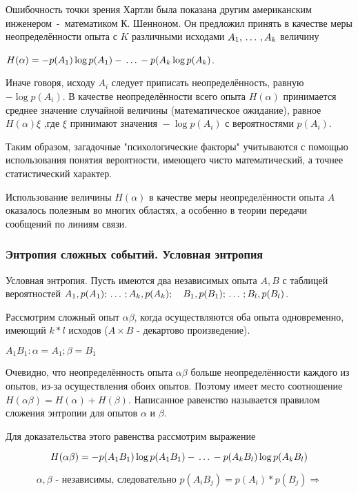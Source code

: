 \documentclass[a4paper,12pt]{report}
\begin{document}
	Ошибочность точки зрения Хартли была показана другим американским инженером~-~математиком К. Шенноном. Он предложил принять в качестве меры неопределённости опыта с $K$ различными исходами $A_1,\,\ldots\,,A_k$ величину
	
	 $H(\alpha) = - p(A_1) \log p(A_1) - \,\ldots\, - p(A_k \log p(A_k)$. 
	
	Иначе говоря, исходу $A_i$ следует приписать неопределённость, равную $- \log p(A_i)$. В качестве неопределённости всего опыта $H(\alpha)$ принимается среднее значение случайной величины (математическое ожидание), равное $H(\alpha) \xi $ ,где $\xi \mbox{ принимают значения } - \log p(A_i) \mbox { с вероятностями } p(A_i)$.

	Таким образом, загадочные "психологические факторы" учитываются с помощью использования понятия вероятности, имеющего чисто математический, а точнее статистический характер.
	
	Использование величины $H(\alpha)$ в качестве меры неопределённости опыта $A$ оказалось полезным во многих областях, а особенно в теории передачи сообщений по линиям связи.

\subsubsection{Энтропия сложных событий. Условная энтропия}

	Условная энтропия. Пусть имеются два независимых опыта $A, B$ с таблицей вероятностей $A_1, p(A_1); \,\ldots\, ;A_k, p(A_k); \quad B_1, p(B_1); \,\ldots\, ;B_l, p(B_l)$.
	
	Рассмотрим сложный опыт $\alpha \beta$, когда осуществляются оба опыта одновременно, имеющий $k*l$ исходов ($A \times B$ - декартово произведение).

	$A_1B_1 : \alpha = A_1; \beta = B_1$

	Очевидно, что неопределённость опыта $\alpha \beta$ больше неопределённости каждого из опытов, из-за осуществления обоих опытов. Поэтому имеет место соотношение $H(\alpha\beta) = H(\alpha)+H(\beta)$. Написанное равенство называется правилом сложения энтропии для опытов $\alpha$ и $\beta$.

	Для доказательства этого равенства рассмотрим выражение 
	
	$$
	  H(\alpha\beta) = 
	    - p(A_1B_1) \log p(A_1 B_1) 
	    - \,\ldots\, 
	    - p(A_kB_l) \log p(A_k B_l)
	$$ 
	
	$$
	 \alpha, \beta \mbox{ - независимы, следовательно } 
	   p(A_iB_j) = p(A_i) * p(B_j) \Rightarrow
	$$
	
\end{document}
